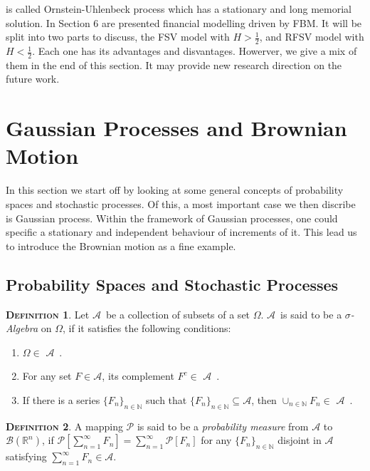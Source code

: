 \documentclass[a4paper, twoside, 11pt]{article}
\theoremstyle{definition}
\newtheorem{definition}{\scshape Definition}[section]
\def\AA{$\mathscr{A}$\ }
\newcommand{\compl}[1]{{#1}^{c}}
\def\bsigma{\mathscr{B}\brkt{\mathbb{R}^{n}}}
\newcommand{\sqbr}[1]{\left[ {#1} \right]}
\newcommand{\brkt}[1]{\left({#1} \right)}
\begin{document}
is called Ornstein-Uhlenbeck process which has a stationary and long memorial solution. In Section 6 are presented financial modelling driven by FBM. It will be split into two parts to discuss, the FSV model with $H > \frac{1}{2}$, and RFSV model with $H < \frac{1}{2}$. Each one has its advantages and disvantages. Howerver, we give a mix of them in the end of this section. It may provide new research direction on the future work.
\newpage

\section{Gaussian Processes and Brownian Motion}
\setcounter{equation}{0}
In this section we start off by looking at some general concepts of probability spaces and stochastic processes. Of this, a most important case we then discribe is Gaussian process. Within the framework of Gaussian processes, one could specific a stationary and independent behaviour of increments of it. This lead us to introduce the Brownian motion as a fine example.

\subsection{Probability Spaces and Stochastic Processes }
\begin{definition}
  Let \AA be a collection of subsets of a set $\Omega$. \AA is said to be a \emph{$\sigma$- Algebra} on $\Omega$, if it satisfies the following conditions:
  \begin{enumerate}[topsep=0pt, itemsep=-1ex, partopsep=1ex, parsep=1ex, label=(\roman*)]
	\item $\Omega \in $ \AA.
	\item For any set $F \in \mathscr{A}$, its complement $\compl{F} \in$ \AA.
	\item If there is a series $\{F_n\}_{n\in \mathbb{N}}$ such that $\{F_n\}_{n \in \mathbb{N}} \subseteq \mathscr{A}$, then $\cup_{n \in \mathbb{N}}F_n \in $ \AA.
  \end{enumerate}
\end{definition}

\begin{definition}
  A mapping $\mathcal{P}$ is said to be a \emph{probability measure} from $\mathscr{A}$ to $\bsigma$, if $\mathcal{P}\sqbr{\sum_{n=1}^{\infty} F_n} = \sum_{n=1}^{\infty} \mathcal{P}\sqbr{F_n}$ for any $\{F_n\}_{n \in \mathbb{N}}$ disjoint in $\mathscr{A}$ satisfying $\sum_{n=1}^{\infty}F_n \in \mathscr{A}$. 
\end{definition}
\end{document}
